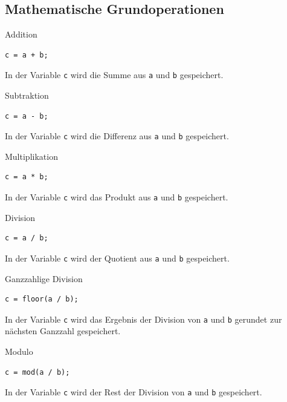 \documentclass[12pt, a4paper, twoside]{article}
\begin{document}
        \subsection{Mathematische Grundoperationen}
            \begin{CodeErklaerungBox}{Addition}
                \begin{lstlisting}
c = a + b;
                \end{lstlisting}
                \tcblower
                In der Variable \texttt{c} wird die Summe aus \texttt{a} und \texttt{b} gespeichert.
                \end{CodeErklaerungBox}
                \begin{CodeErklaerungBox}{Subtraktion}
                \begin{lstlisting}
c = a - b;
                \end{lstlisting}
                \tcblower
                In der Variable \texttt{c} wird die Differenz aus \texttt{a} und \texttt{b} gespeichert.
                \end{CodeErklaerungBox}
                \begin{CodeErklaerungBox}{Multiplikation}
                \begin{lstlisting}
c = a * b;
                \end{lstlisting}
                \tcblower
                In der Variable \texttt{c} wird das Produkt aus \texttt{a} und \texttt{b} gespeichert.
                \end{CodeErklaerungBox}
                \begin{CodeErklaerungBox}{Division}
                \begin{lstlisting}
c = a / b;
                \end{lstlisting}
                \tcblower
                In der Variable \texttt{c} wird der Quotient aus \texttt{a} und \texttt{b} gespeichert.
                \end{CodeErklaerungBox}
                \begin{CodeErklaerungBox}{Ganzzahlige Division}
                \begin{lstlisting}
c = floor(a / b);
                \end{lstlisting}
                \tcblower
                In der Variable \texttt{c} wird das Ergebnis der Division von \texttt{a} und \texttt{b} gerundet zur nächsten Ganzzahl gespeichert.
                \end{CodeErklaerungBox}
                \begin{CodeErklaerungBox}{Modulo}
                \begin{lstlisting}
c = mod(a / b);
                \end{lstlisting}
                \tcblower
                In der Variable \texttt{c} wird der Rest der Division von \texttt{a} und \texttt{b} gespeichert.
                \end{CodeErklaerungBox}
\end{document}
